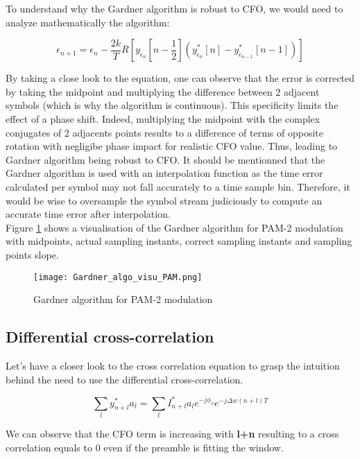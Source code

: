 To understand why the Gardner algorithm is robust to CFO, we would need to analyze mathematically the algorithm:

\begin{equation*}
    \epsilon_{n+1} = \epsilon_{n} - \frac{2k}{T} R[y_{\epsilon_{n}}[n-\frac{1}{2}](y_{\epsilon_{n}}^{*}[n] - y_{\epsilon_{n-1}}^{*}[n-1])]
\end{equation*}

By taking a close look to the equation, one can observe that the error is corrected by taking the midpoint and multiplying the difference between 2 adjacent symbols (which is why the algorithm is
continuous). This specificity limits the effect of a phase shift.  Indeed, multiplying the midpoint with the complex conjugates of 2 adjacents points results to 
a difference of terms of opposite rotation with negligibe phase impact for realistic CFO value.  Thus, leading to Gardner algorithm being robust to CFO.\newline
It should be mentionned that the Gardner algorithm is used with an interpolation function as the time error calculated per symbol 
may not fall accurately to a time sample bin.  Therefore, it would be wise to oversample the symbol stream judiciously to compute an 
accurate time error after interpolation. \\
Figure \ref{fig:Gardner_algo_visu_PAM} shows a visualisation of the Gardner algorithm for PAM-2 modulation with midpoints, actual sampling instants,
correct sampling instants and sampling points slope.
\begin{figure}[H]
    \centering
    \texttt{[image: Gardner\_algo\_visu\_PAM.png]}
    \caption{Gardner algorithm for PAM-2 modulation}
    \label{fig:Gardner_algo_visu_PAM}
\end{figure}


\subsection{Differential cross-correlation}

Let's have a closer look to the cross correlation equation to grasp the intuition behind the need to use the differential cross-correlation.

\begin{equation*}
    \sum_{l}{y^{*}_{n+l}a_{l}} = \sum_{l}{I^{*}_{n+l}a_{l}e^{-j\phi_{o}}e^{-j\Delta w(n+l)T}}
\end{equation*}

We can observe that the CFO term is increasing with \textbf{l+n} resulting to a cross correlation equals to 0 even if the preamble is fitting
the window.

